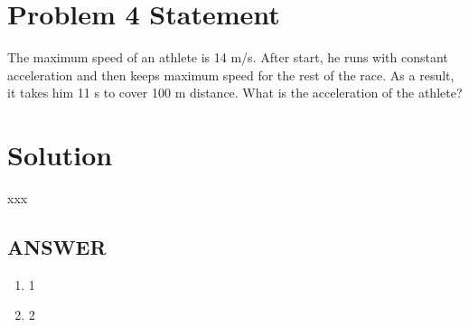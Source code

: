 \section*{Problem 4 Statement}

The maximum speed of an athlete is 14 m/s. After start, he runs with constant acceleration and
then keeps maximum speed for the rest of the race. As a result, it takes him 11 s to cover 100 m
distance. What is the acceleration of the athlete?

\section*{Solution}

xxx

\vfill
\subsection*{ANSWER}
\begin{enumerate}
    \item 1
    \item 2
\end{enumerate}